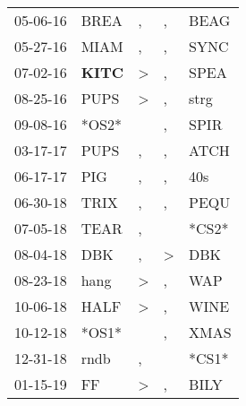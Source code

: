 \begin{supertabular}{p{0.07\textwidth}p{0.06\textwidth}p{0.02\textwidth}p{0.02\textwidth}p{0.06\textwidth}}
 05-06-16\textsuperscript{} &           BREA\textsuperscript{} &             , &             , &  BEAG\textsuperscript{} \\
 05-27-16\textsuperscript{} &           MIAM\textsuperscript{} &             , &             , &  SYNC\textsuperscript{} \\
 07-02-16\textsuperscript{} &  \textbf{KITC\textsuperscript{}} &  \textgreater &             , &  SPEA\textsuperscript{} \\
 08-25-16\textsuperscript{} &           PUPS\textsuperscript{} &  \textgreater &             , &  strg\textsuperscript{} \\
 09-08-16\textsuperscript{} &                            *OS2* &               &             , &  SPIR\textsuperscript{} \\
 03-17-17\textsuperscript{} &           PUPS\textsuperscript{} &             , &             , &  ATCH\textsuperscript{} \\
 06-17-17\textsuperscript{} &            PIG\textsuperscript{} &             , &             , &   40s\textsuperscript{} \\
 06-30-18\textsuperscript{} &           TRIX\textsuperscript{} &             , &             , &  PEQU\textsuperscript{} \\
 07-05-18\textsuperscript{} &           TEAR\textsuperscript{} &             , &               &                   *CS2* \\
 08-04-18\textsuperscript{} &            DBK\textsuperscript{} &             , &  \textgreater &   DBK\textsuperscript{} \\
 08-23-18\textsuperscript{} &           hang\textsuperscript{} &  \textgreater &             , &   WAP\textsuperscript{} \\
 10-06-18\textsuperscript{} &           HALF\textsuperscript{} &  \textgreater &             , &  WINE\textsuperscript{} \\
 10-12-18\textsuperscript{} &                            *OS1* &               &             , &  XMAS\textsuperscript{} \\
 12-31-18\textsuperscript{} &           rndb\textsuperscript{} &             , &               &                   *CS1* \\
 01-15-19\textsuperscript{} &             FF\textsuperscript{} &  \textgreater &             , &  BILY\textsuperscript{} \\

\end{supertabular}
